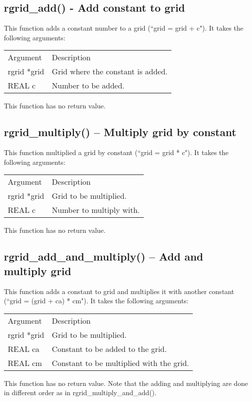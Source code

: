 \documentclass[12pt,letterpaper]{report}
\begin{document}
\subsection{rgrid\_add() - Add constant to grid}

This function adds a constant number to a grid (``grid = grid + c"). It takes the following arguments:
\begin{longtable}{p{} p{}}
Argument & Description\\
\cline{1-2}
rgrid *grid & Grid where the constant is added.\\
REAL c & Number to be added.\\
\end{longtable}
\noindent
This function has no return value.

\subsection{rgrid\_multiply() -- Multiply grid by constant}

This function multiplied a grid by constant (``grid = grid * c"). It takes the following arguments:
\begin{longtable}{p{} p{}}
Argument & Description\\
\cline{1-2}
rgrid *grid & Grid to be multiplied.\\
REAL c & Number to multiply with.\\
\end{longtable}
\noindent
This function has no return value.

\subsection{rgrid\_add\_and\_multiply() -- Add and multiply grid}

This function adds a constant to grid and multiplies it with another constant (``grid = (grid + ca) * cm"). It takes the following arguments:
\begin{longtable}{p{} p{}}
Argument & Description\\
\cline{1-2}
rgrid *grid & Grid to be multiplied.\\
REAL ca & Constant to be added to the grid.\\
REAL cm & Constant to be multiplied with the grid.\\
\end{longtable}
\noindent
This function has no return value. Note that the adding and multiplying are done in different order as in rgrid\_multiply\_and\_add().
\end{document}
